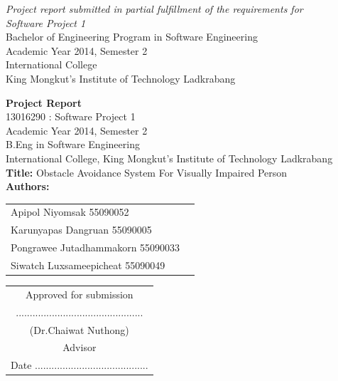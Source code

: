 \documentclass[11pt, oneside]{Thesis} %
\begin{document}
\begin{titlepage}
\begin{center}
\large \textit{Project report submitted in partial fulfillment of the requirements for \\
	Software Project 1}\\[0.3cm] %

Bachelor of Engineering Program in Software Engineering \\
Academic Year 2014, Semester 2 \\
International College \\
King Mongkut's Institute of Technology Ladkrabang \\
\vfill
\end{center}
\end{titlepage}

\clearpage %
\textbf{Project Report}\\
13016290 : Software Project 1\\
Academic Year 2014, Semester 2\\
B.Eng in Software Engineering\\
International College, King Mongkut's Institute of Technology Ladkrabang\\ 

\textbf{Title:} Obstacle Avoidance System For Visually Impaired Person\\


\textbf{Authors:}\\
\begin{tabular}{ll}
	Apipol Niyomsak 55090052 \\
	Karunyapas Dangruan 55090005 \\
	Pongrawee Jutadhammakorn 55090033 \\
	Siwatch Luxsameepicheat 55090049 \\
\end{tabular}

\vspace{11cm}

\begin{flushright}
	\begin{tabular}{c}
		Approved for submission\\
		..............................................\\
		(Dr.Chaiwat Nuthong)\\
		Advisor\\
		Date .........................................\\
	\end{tabular}
\end{flushright}
\end{document}

